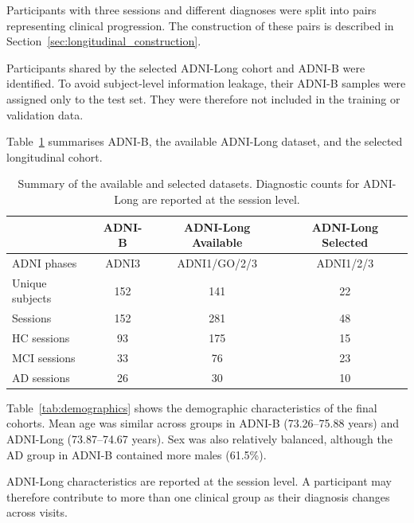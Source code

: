 Participants with three sessions and different diagnoses were split
into pairs representing clinical progression. The construction of these
pairs is described in Section~\ref{sec:longitudinal_construction}.

Participants shared by the selected ADNI-Long cohort and ADNI-B were
identified. To avoid subject-level information leakage, their ADNI-B
samples were assigned only to the test set. They were therefore not
included in the training or validation data.

Table~\ref{tab:dataset_summary} summarises ADNI-B, the available
ADNI-Long dataset, and the selected longitudinal cohort.

\begin{table}[ht]
    \centering
    \caption{Summary of the available and selected datasets. Diagnostic
    counts for ADNI-Long are reported at the session level.}
    \label{tab:dataset_summary}
    \begin{tabular}{lccc}
        \hline
        & ADNI-B & ADNI-Long Available & ADNI-Long Selected \\
        \hline
        ADNI phases & ADNI3 & ADNI1/GO/2/3 & ADNI1/2/3 \\
        Unique subjects & 152 & 141 & 22 \\
        Sessions & 152 & 281 & 48 \\
        HC sessions & 93 & 175 & 15 \\
        MCI sessions & 33 & 76 & 23 \\
        AD sessions & 26 & 30 & 10 \\
        \hline
    \end{tabular}
\end{table}

Table~\ref{tab:demographics} shows the demographic characteristics of
the final cohorts. Mean age was similar across groups in ADNI-B
(73.26--75.88 years) and ADNI-Long (73.87--74.67 years). Sex was also
relatively balanced, although the AD group in ADNI-B contained more
males (61.5\%).

ADNI-Long characteristics are reported at the session level. A
participant may therefore contribute to more than one clinical group as
their diagnosis changes across visits.

